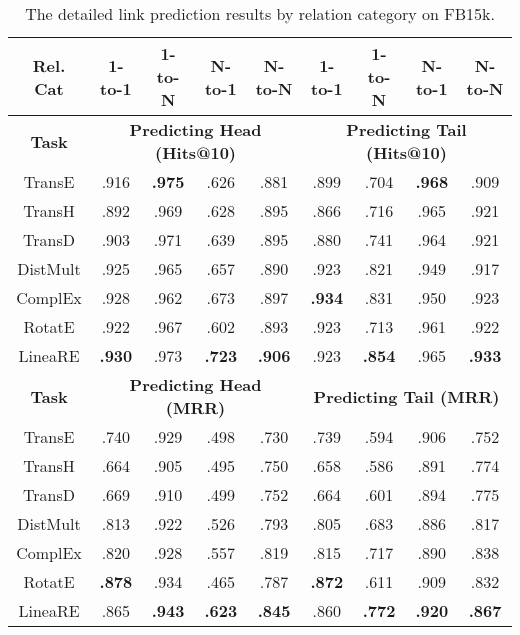 \documentclass[conference]{IEEEtran}
\begin{document}
\begin{table*}[t]
	\caption{
		The detailed link prediction results by relation category on FB15k.
	}
	\label{RelationCategery}
	\centering
	\begin{tabular}{|c||c|c|c|c||c|c|c|c|}
		\hline
		\textbf{Rel. Cat}
		& \textbf{1-to-1}	& \textbf{1-to-N}	& \textbf{N-to-1}	& \textbf{N-to-N}	& \textbf{1-to-1}	& \textbf{1-to-N}	& \textbf{N-to-1}	& \textbf{N-to-N}  \\
		\hline
		\textbf{Task}
		& \multicolumn{4}{c||}{\textbf{Predicting Head (Hits@10)}}
		& \multicolumn{4}{c||}{\textbf{Predicting Tail (Hits@10)}}   \\
		\hline
		TransE \cite{TransE}	& .916	& \textbf{.975}	& .626	& .881	& .899	& .704	& \textbf{.968}	& .909  \\
		TransH \cite{TransH}	& .892	& .969	& .628	& .895	& .866	& .716	& .965	& .921  \\
		TransD \cite{TransH}	& .903	& .971	& .639	& .895	& .880	& .741	& .964	& .921  \\
		DistMult \cite{DistMult}& .925	& .965	& .657	& .890	& .923	& .821	& .949	& .917  \\
		ComplEx	\cite{ComplEx} & .928	& .962	& .673	& .897	& \textbf{.934}	& .831	& .950	& .923  \\
		RotatE \cite{RotatE}	& .922	& .967	& .602	& .893	& .923	& .713	& .961	& .922  \\
		\hline
		LineaRE			& \textbf{.930}	& .973	& \textbf{.723}	& \textbf{.906}	& .923	& \textbf{.854}	& .965	& \textbf{.933}  \\
		\hline
		\hline
		\textbf{Task}
		& \multicolumn{4}{c||}{\textbf{Predicting Head (MRR)}}
		& \multicolumn{4}{c||}{\textbf{Predicting Tail (MRR)}}   \\
		\hline
		TransE \cite{TransE}	& .740	& .929	& .498	& .730	& .739	& .594	& .906	& .752  \\
		TransH \cite{TransH}	& .664	& .905	& .495	& .750	& .658	& .586	& .891	& .774  \\
		TransD \cite{TransH}	& .669	& .910	& .499	& .752	& .664	& .601	& .894	& .775  \\
		DistMult \cite{DistMult}& .813	& .922	& .526	& .793	& .805	& .683	& .886	& .817  \\
		ComplEx \cite{ComplEx}	& .820	& .928	& .557	& .819	& .815	& .717	& .890	& .838  \\
		RotatE \cite{RotatE}	& \textbf{.878}	& .934	& .465	& .787	& \textbf{.872}	& .611	& .909	& .832  \\
		\hline
		LineaRE	& .865	& \textbf{.943}	& \textbf{.623}	& \textbf{.845}	& .860	& \textbf{.772}	& \textbf{.920}	& \textbf{.867}  \\
		\hline
	\end{tabular}
\end{table*}
\end{document}
